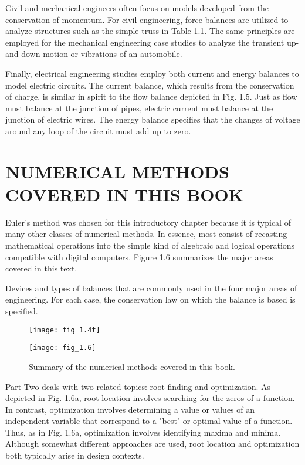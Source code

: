 \documentclass[../main.tex]{subfiles}
\begin{document}
Civil and mechanical engineers often focus on models developed from the conservation of momentum. For civil engineering, force balances are utilized to analyze structures
such as the simple truss in Table 1.1. The same principles are employed for the mechanical
engineering case studies to analyze the transient up-and-down motion or vibrations of an
automobile.

Finally, electrical engineering studies employ both current and energy balances to model
electric circuits. The current balance, which results from the conservation of charge, is similar in 
spirit to the flow balance depicted in Fig. 1.5. Just as flow must balance at the junction
of pipes, electric current must balance at the junction of electric wires. The energy balance
specifies that the changes of voltage around any loop of the circuit must add up to zero.



\section{NUMERICAL METHODS COVERED IN THIS BOOK}

Euler's method was chosen for this introductory chapter because it is typical of many other
classes of numerical methods. In essence, most consist of recasting mathematical operations 
into the simple kind of algebraic and logical operations compatible with digital computers.
 Figure 1.6 summarizes the major areas covered in this text. 
\begin{table}[H]
\caption{\textsf{Devices and types of balances that are commonly used in the four major areas of engineering. For
each case, the conservation law on which the balance is based is specified.}}
 \begin{figure}[H]
	\centering
	\texttt{[image: fig\_1.4t]}
   
   \label{fig_1.}
\end{figure}
\end{table}


\begin{figure}[H]
	\centering
	\texttt{[image: fig\_1.6]}
   \caption{\textsf{Summary of the numerical methods covered in this book.}}
   \label{fig_1.}
\end{figure}


Part Two deals with two related topics: root finding and optimization. As depicted in
Fig. 1.6a, root location involves searching for the zeros of a function. In contrast, optimization involves determining 
a value or values of an independent variable that correspond to a
"best" or optimal value of a function. Thus, as in Fig. 1.6a, optimization involves identifying maxima and minima.
 Although somewhat different approaches are used, root location
and optimization both typically arise in design contexts.
\end{document}
